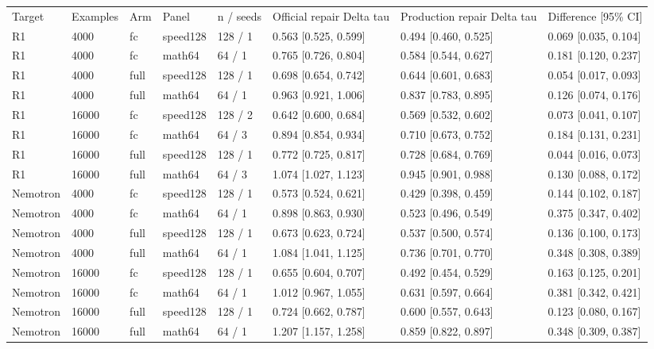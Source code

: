 \begin{tabular}{llllllll}
Target & Examples & Arm & Panel & n / seeds & Official repair Delta tau & Production repair Delta tau & Difference [95\% CI] \\
R1 & 4000 & fc & speed128 & 128 / 1 & 0.563 [0.525, 0.599] & 0.494 [0.460, 0.525] & 0.069 [0.035, 0.104] \\
R1 & 4000 & fc & math64 & 64 / 1 & 0.765 [0.726, 0.804] & 0.584 [0.544, 0.627] & 0.181 [0.120, 0.237] \\
R1 & 4000 & full & speed128 & 128 / 1 & 0.698 [0.654, 0.742] & 0.644 [0.601, 0.683] & 0.054 [0.017, 0.093] \\
R1 & 4000 & full & math64 & 64 / 1 & 0.963 [0.921, 1.006] & 0.837 [0.783, 0.895] & 0.126 [0.074, 0.176] \\
R1 & 16000 & fc & speed128 & 128 / 2 & 0.642 [0.600, 0.684] & 0.569 [0.532, 0.602] & 0.073 [0.041, 0.107] \\
R1 & 16000 & fc & math64 & 64 / 3 & 0.894 [0.854, 0.934] & 0.710 [0.673, 0.752] & 0.184 [0.131, 0.231] \\
R1 & 16000 & full & speed128 & 128 / 1 & 0.772 [0.725, 0.817] & 0.728 [0.684, 0.769] & 0.044 [0.016, 0.073] \\
R1 & 16000 & full & math64 & 64 / 3 & 1.074 [1.027, 1.123] & 0.945 [0.901, 0.988] & 0.130 [0.088, 0.172] \\
Nemotron & 4000 & fc & speed128 & 128 / 1 & 0.573 [0.524, 0.621] & 0.429 [0.398, 0.459] & 0.144 [0.102, 0.187] \\
Nemotron & 4000 & fc & math64 & 64 / 1 & 0.898 [0.863, 0.930] & 0.523 [0.496, 0.549] & 0.375 [0.347, 0.402] \\
Nemotron & 4000 & full & speed128 & 128 / 1 & 0.673 [0.623, 0.724] & 0.537 [0.500, 0.574] & 0.136 [0.100, 0.173] \\
Nemotron & 4000 & full & math64 & 64 / 1 & 1.084 [1.041, 1.125] & 0.736 [0.701, 0.770] & 0.348 [0.308, 0.389] \\
Nemotron & 16000 & fc & speed128 & 128 / 1 & 0.655 [0.604, 0.707] & 0.492 [0.454, 0.529] & 0.163 [0.125, 0.201] \\
Nemotron & 16000 & fc & math64 & 64 / 1 & 1.012 [0.967, 1.055] & 0.631 [0.597, 0.664] & 0.381 [0.342, 0.421] \\
Nemotron & 16000 & full & speed128 & 128 / 1 & 0.724 [0.662, 0.787] & 0.600 [0.557, 0.643] & 0.123 [0.080, 0.167] \\
Nemotron & 16000 & full & math64 & 64 / 1 & 1.207 [1.157, 1.258] & 0.859 [0.822, 0.897] & 0.348 [0.309, 0.387] \\
\end{tabular}

